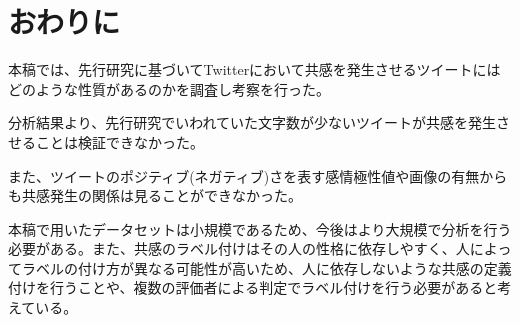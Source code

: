 \documentclass[dvipdfmx]{issj}
\begin{document}












\section{おわりに}  %

本稿では、先行研究に基づいてTwitterにおいて共感を発生させるツイートにはどのような性質があるのかを調査し考察を行った。

分析結果より、先行研究でいわれていた文字数が少ないツイートが共感を発生させることは検証できなかった。

また、ツイートのポジティブ(ネガティブ)さを表す感情極性値や画像の有無からも共感発生の関係は見ることができなかった。

本稿で用いたデータセットは小規模であるため、今後はより大規模で分析を行う必要がある。また、共感のラベル付けはその人の性格に依存しやすく、人によってラベルの付け方が異なる可能性が高いため、人に依存しないような共感の定義付けを行うことや、複数の評価者による判定でラベル付けを行う必要があると考えている。
\end{document}
